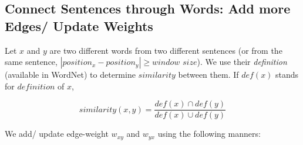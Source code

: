 \documentclass[a4paper]{report}
\begin{document}
\subsection{Connect Sentences through Words: Add more Edges/ Update Weights }
Let $x$ and $y$ are two different words from two different sentences (or from the same sentence,
$|position_x - position_y| \ge window$ $size$). We use their \emph{definition} (available in WordNet) to determine $similarity$ between them. 
If $def(x)$ stands for $definition$ of $x$, 
\begin{small}
\begin{equation}
similarity(x, y) = \frac{def(x) \cap def(y)}{def(x) \cup def(y)}
\end{equation}
\end{small}
\vspace{-.1in}
We add/ update edge-weight $w_{xy}$ and $w_{yx}$ using the following manners:
\end{document}

